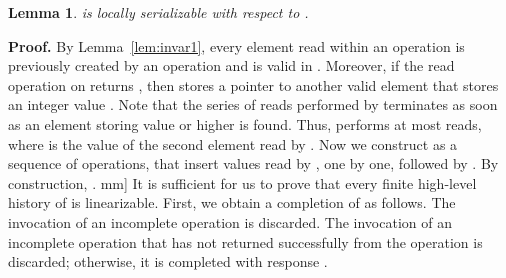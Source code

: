 \documentclass[11pt,pdftex,letterpaper]{article}
\newtheorem{lemma}[theorem]{Lemma}
\newenvironment{proof}[1][Proof]{\noindent\textbf{#1.} }{\hfill \2mm]}
\begin{document}
\begin{lemma}
\label{lem:rls}
 is locally serializable with respect to .
\end{lemma}
\begin{proof}
By Lemma~\ref{lem:invar1}, every element  read 
within an operation  
is previously created by an  operation and is valid in .
Moreover, if the read operation on  returns , then 
 stores a pointer to another valid element that
stores an integer value .
Note that the series of reads performed by  terminates as soon as 
an element storing value  or higher is found. Thus,  performs at most
 reads, where  is the value of the second element read by .  
Now we construct  as a sequence of  operations,
that insert values read by , one by one, followed by . 
By construction, .
\end{proof}
It is sufficient for us to prove that every finite high-level history 
of  is linearizable.
First, we obtain a completion  of  as follows.
The invocation of an incomplete  operation is discarded.
The invocation of an incomplete 
operation that has not returned successfully from the 
operation is discarded; otherwise, it is completed with response .
\end{document}
